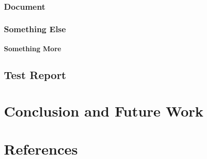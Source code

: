 \documentclass{vitmsprojectreport}
\begin{document}
\subsection{Document}

\subsection{Something Else}

\subsubsection{Something More}

\section{Test Report}

\chapter{Conclusion and Future Work}

\chapter{References}
\end{document}
